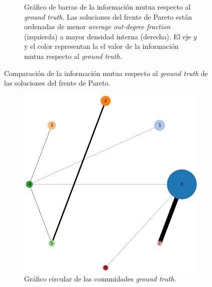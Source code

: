 \begin{figure}[!htb]
\begin{subfigure}{.48\textwidth}
    \caption{Gráfico de barras de la información mutua respecto al \emph{ground
      truth}. Las soluciones del frente de Pareto están ordenadas de menor
      \emph{average out-degree fraction} (izquierda) a mayor densidad interna
      (derecha). El eje \(y\) y el color representan la el valor de la
      información mutua respecto al \emph{ground truth}.}
  \label{fig:3-pareto-nmi-2}
  \end{subfigure}
  \caption{Comparación de la información mutua respecto al \emph{ground truth}
  de las soluciones del frente de Pareto.}
  \label{fig:3-pareto-nmi}
\end{figure}

\begin{figure}[!htb]
  \centering
  \begin{subfigure}{.4\textwidth}
    \centering
    \includegraphics[width=.9\linewidth]{img/1_circular_comp_1}
    \caption{Gráfico circular de las comunidades \emph{ground truth}. }
    \label{fig:3-circular-comp-1}
  \end{subfigure}%
  \hfill
  \begin{subfigure}{.4\textwidth}
    \centering

\end{subfigure}
\end{figure}
